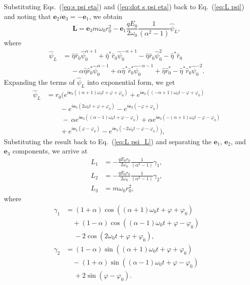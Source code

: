 \documentclass[twocolumn,showpacs,preprintnumbers,amsmath,amssymb]{revtex4}
\begin{document}
Substituting Eqs.~(\ref{eq:s psi eta}) and (\ref{eq:dot s psi eta}) back to Eq.~(\ref{eq:L psi}) and noting that $\mathbf e_2 i \mathbf e_3  = -\mathbf e_1$, we obtain
\begin{equation}
\label{eq:L psi_L}
\mathbf L =  \mathbf e_3 m\omega_0r_0^2 - \mathbf e_1\frac{qE_0}{2\omega_0}\frac{1}{(\alpha^2 - 1)}\hat\psi_L,
\end{equation}
where 
\begin{align}
\label{eq:psi_L}
\hat\psi_L &= \hat\eta\hat r_0\hat\psi_0^{\alpha+1} + \hat\eta^*\hat r_0\hat\psi_0^{-\alpha+1} - \hat\eta\hat r_0\hat\psi_0^2 - \hat\eta^*\hat r_0\nonumber\\
&\quad\ -\alpha\hat\eta\hat r_0^*\hat\psi_0^{\alpha-1} + \alpha\hat\eta^*\hat r_0^*\hat\psi_0^{-\alpha-1} + \hat\eta\hat r_0^* - \hat\eta^*\hat r_0^*\hat\psi_0^{-2}.
\end{align}
Expanding the terms of $\hat\psi_L$ into exponential form, we get 
\begin{align}
\hat\psi_L &= r_0(e^{ i \mathbf e_3 ((\alpha + 1)\omega_0 t +\varphi +\varphi_0)} + e^{ i \mathbf e_3 ((-\alpha + 1)\omega_0 t -\varphi +\varphi_0)} \nonumber \\ 
& \qquad - e^{ i \mathbf e_3 (2\omega_0 t +\varphi +\varphi_0)}  - e^{ i \mathbf e_3 (-\varphi +\varphi_0)}\nonumber\\
&\qquad\ -\, \alpha e^{ i \mathbf e_3 ((\alpha - 1)\omega_0 t +\varphi -\varphi_0)} + \alpha e^{ i \mathbf e_3 (-(\alpha + 1)\omega_0 t -\varphi -\varphi_0)} \nonumber \\
&\qquad + e^{ i \mathbf e_3 (\varphi -\varphi_0)} - e^{ i \mathbf e_3 (-2\omega_0 t -\varphi -\varphi_0)}),
\end{align}
Substituting the result back to Eq.~(\ref{eq:L psi_L}) and separating the $\mathbf e_1$, $\mathbf e_2$, and $\mathbf e_3$ components, we arrive at
\begin{subequations}
\begin{align}
L_1 &= -\frac{qE_0r_0}{2\omega_0}\frac{1}{(\alpha^2 - 1)}\gamma_1,\\
L_2 &= -\frac{qE_0r_0}{2\omega_0}\frac{1}{(\alpha^2 - 1)}\gamma_2,\\
L_3 &= m\omega_0r_0^2,
\end{align}
\end{subequations}
where
\begin{subequations}
\begin{align}
\gamma_1 &= (1 +\alpha)\cos((\alpha + 1)\omega_0 t +\varphi +\varphi_0) \nonumber \\
&\quad+ (1 - \alpha)\cos((\alpha - 1)\omega_0 t +\varphi -\varphi_0)\nonumber\\
&\quad\ - 2\cos(2\omega_0 t +\varphi +\varphi_0),\\
\gamma_2 &= (1 -\alpha)\sin((\alpha + 1)\omega_0 t +\varphi +\varphi_0) \nonumber \\
&\quad - (1 + \alpha)\sin((\alpha - 1)\omega_0 t +\varphi -\varphi_0)\nonumber\\
&\quad\ + 2\sin(\varphi - \varphi_0).
\end{align}
\end{subequations}
\end{document}
